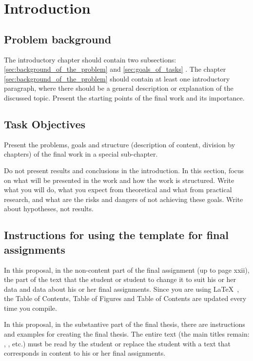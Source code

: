 \chapter{Introduction}\label{cha:introduction}

\section{Problem background}\label{sec:problem_background}
The introductory chapter should contain two subsections: \ref{sec:background_of_the_problem}  and \ref{sec:goals_of_tasks} . The chapter \ref{sec:background_of_the_problem}  should contain at least one introductory paragraph, where there should be a general description or explanation of the discussed topic. Present the starting points of the final work and its importance.


\section{Task Objectives}\label{sec:Task_Objectives}
Present the problems, goals and structure (description of content, division by chapters) of the final work in a special sub-chapter.

Do not present results and conclusions in the introduction. In this section, focus on what will be presented in the work and how the work is structured. Write what you will do, what you expect from theoretical and what from practical research, and what are the risks and dangers of not achieving these goals. Write about hypotheses, not results.

\section{Instructions for using the template for final assignments}\label{sec:using_the_template}
In this proposal, in the non-content part of the final assignment (up to page xxii), the part of the text that the student or student to change it to suit his or her data and data about his or her final assignments. Since you are using \LaTeX~, the Table of Contents, Table of Figures and Table of Contents are updated every time you compile.

In this proposal, in the substantive part of the final thesis, there are instructions and examples for creating the final thesis. The entire text (the main titles remain: , , etc.) must be read by the student or replace the student with a text that corresponds in content to his or her final assignments.

